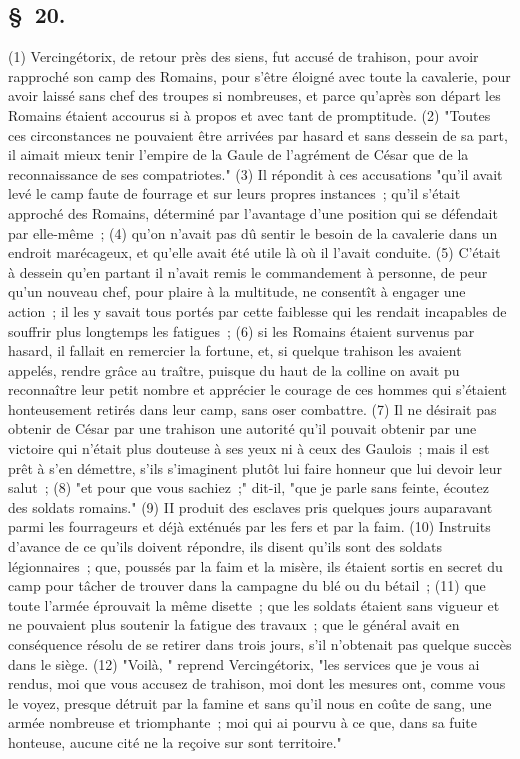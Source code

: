 \documentclass[french,twoside]{book} %
\begin{document}
\subsection[{§ 20.}]{ \textsc{§ 20.} }
\noindent (1) Vercingétorix, de retour près des siens, fut accusé de trahison, pour avoir rapproché son camp des Romains, pour s’être éloigné avec toute la cavalerie, pour avoir laissé sans chef des troupes si nombreuses, et parce qu’après son départ les Romains étaient accourus si à propos et avec tant de promptitude. (2) "Toutes ces circonstances ne pouvaient être arrivées par hasard et sans dessein de sa part, il aimait mieux tenir l’empire de la Gaule de l’agrément de César que de la reconnaissance de ses compatriotes." (3) Il répondit à ces accusations "qu’il avait levé le camp faute de fourrage et sur leurs propres instances ; qu’il s’était approché des Romains, déterminé par l’avantage d’une position qui se défendait par elle-même ; (4) qu’on n’avait pas dû sentir le besoin de la cavalerie dans un endroit marécageux, et qu’elle avait été utile là où il l’avait conduite. (5) C'était à dessein qu’en partant il n’avait remis le commandement à personne, de peur qu’un nouveau chef, pour plaire à la multitude, ne consentît à engager une action ; il les y savait tous portés par cette faiblesse qui les rendait incapables de souffrir plus longtemps les fatigues ; (6) si les Romains étaient survenus par hasard, il fallait en remercier la fortune, et, si quelque trahison les avaient appelés, rendre grâce au traître, puisque du haut de la colline on avait pu reconnaître leur petit nombre et apprécier le courage de ces hommes qui s’étaient honteusement retirés dans leur camp, sans oser combattre. (7) Il ne désirait pas obtenir de César par une trahison une autorité qu’il pouvait obtenir par une victoire qui n’était plus douteuse à ses yeux ni à ceux des Gaulois ; mais il est prêt à s’en démettre, s’ils s’imaginent plutôt lui faire honneur que lui devoir leur salut ; (8) "et pour que vous sachiez ;" dit-il, "que je parle sans feinte, écoutez des soldats romains." (9) II produit des esclaves pris quelques jours auparavant parmi les fourrageurs et déjà exténués par les fers et par la faim. (10) Instruits d’avance de ce qu’ils doivent répondre, ils disent qu’ils sont des soldats légionnaires ; que, poussés par la faim et la misère, ils étaient sortis en secret du camp pour tâcher de trouver dans la campagne du blé ou du bétail ; (11) que toute l’armée éprouvait la même disette ; que les soldats étaient sans vigueur et ne pouvaient plus soutenir la fatigue des travaux ; que le général avait en conséquence résolu de se retirer dans trois jours, s’il n’obtenait pas quelque succès dans le siège. (12) "Voilà, " reprend Vercingétorix, "les services que je vous ai rendus, moi que vous accusez de trahison, moi dont les mesures ont, comme vous le voyez, presque détruit par la famine et sans qu’il nous en coûte de sang, une armée nombreuse et triomphante ; moi qui ai pourvu à ce que, dans sa fuite honteuse, aucune cité ne la reçoive sur sont territoire."
\end{document}
